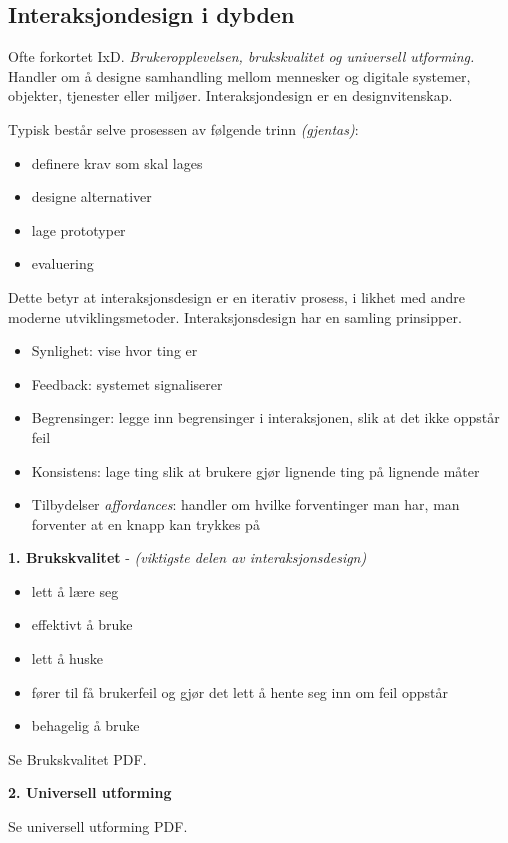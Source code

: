 \documentclass{article}
\begin{document}
\begin{flushleft}
\section{\textbf{Interaksjondesign i dybden}}
Ofte forkortet IxD. \emph{Brukeropplevelsen, brukskvalitet og universell utforming.}
Handler om å designe samhandling mellom mennesker og digitale systemer, objekter, tjenester eller miljøer. 
Interaksjondesign er en designvitenskap.\par
Typisk består selve prosessen av følgende trinn \emph{(gjentas)}:
\begin{itemize}
    \item definere krav som skal lages
    \item designe alternativer
    \item lage prototyper
    \item evaluering
\end{itemize}
Dette betyr at interaksjonsdesign er en iterativ prosess, i likhet med andre moderne utviklingsmetoder. 
Interaksjonsdesign har en samling prinsipper. 
\begin{itemize}
    \item Synlighet: vise hvor ting er 
    \item Feedback: systemet signaliserer
    \item Begrensinger: legge inn begrensinger i interaksjonen, slik at det ikke oppstår feil
    \item Konsistens: lage ting slik at brukere gjør lignende ting på lignende måter
    \item Tilbydelser \emph{affordances}: handler om hvilke forventinger man har, man forventer at en knapp kan trykkes på
\end{itemize}
\bigskip
\bigskip
\bigskip
\textbf{1. Brukskvalitet} - \emph{(viktigste delen av interaksjonsdesign)}
\bigskip
\begin{itemize}
    \item lett å lære seg 
    \item effektivt å bruke
    \item lett å huske
    \item fører til få brukerfeil og gjør det lett å hente seg inn om feil oppstår
    \item behagelig å bruke
\end{itemize}
Se Brukskvalitet PDF.\par
\bigskip

\textbf{2. Universell utforming} \par
Se universell utforming PDF.
\bigskip


\end{flushleft}
\end{document}
